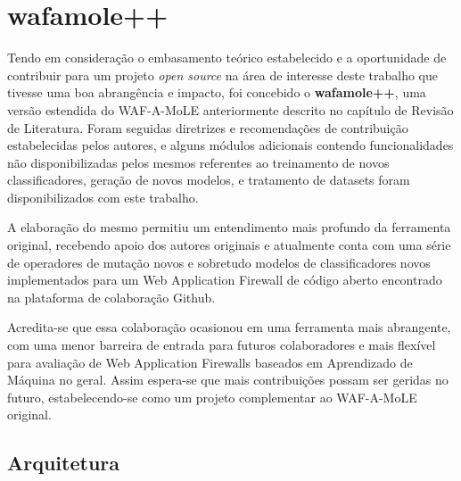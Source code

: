 \chapter{wafamole++}
\label{chp:capitulo4}

Tendo em consideração o embasamento teórico estabelecido e a oportunidade de contribuir para um projeto \textit{open source} na área de interesse deste trabalho que tivesse uma boa abrangência e impacto, foi concebido o \textbf{wafamole++}, uma versão estendida do WAF-A-MoLE anteriormente descrito no capítulo de Revisão de Literatura. Foram seguidas diretrizes e recomendações de contribuição estabelecidas pelos autores, e alguns módulos adicionais contendo funcionalidades não disponibilizadas pelos mesmos referentes ao treinamento de novos classificadores, geração de novos modelos, e tratamento de datasets foram disponibilizados com este trabalho.

A elaboração do mesmo permitiu um entendimento mais profundo da ferramenta original, recebendo apoio dos autores originais e atualmente conta com uma série de operadores de mutação novos e sobretudo modelos de classificadores novos implementados para um Web Application Firewall de código aberto encontrado na plataforma de colaboração Github.

Acredita-se que essa colaboração ocasionou em uma ferramenta mais abrangente, com uma menor barreira de entrada para futuros colaboradores e mais flexível para avaliação de Web Application Firewalls baseados em Aprendizado de Máquina no geral. Assim espera-se que mais contribuições possam ser geridas no futuro, estabelecendo-se como um projeto complementar ao WAF-A-MoLE original.


\section{Arquitetura}

